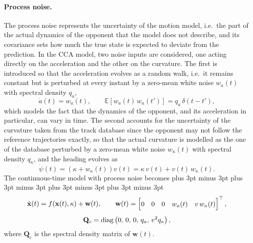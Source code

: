 \paragraph{Process noise.} The process noise represents the uncertainty of the motion model,
i.e.\ the part of the actual dynamics of the opponent that the model does not describe, and its
covariance sets how much the true state is expected to deviate from the prediction. In the CCA
model, two noise inputs are considered, one acting directly on the acceleration and the other on
the curvature. The first is introduced so that the acceleration evolves as a random walk, i.e.\
it remains constant but is perturbed at every instant by a zero-mean white noise $w_a(t)$ with
spectral density $q_a$,
\begin{equation}
    \dot a(t) = w_a(t), \qquad
    \mathbb{E}\left[w_a(t)\,w_a(t')\right] = q_a\,\delta(t - t'),
\end{equation}
which models the fact that the dynamics of the opponent, and its acceleration in particular,
can vary in time. The second accounts for
the uncertainty of the curvature taken from the track database since the opponent may not follow
the reference trajectories exactly, so that the actual curvature is modelled as the one of the
database perturbed by a zero-mean white noise $w_\kappa(t)$ with spectral density $q_\kappa$,
and the heading evolves as
\begin{equation}
    \dot\psi(t) = \left(\kappa + w_\kappa(t)\right) v(t) = \kappa\,v(t) + v(t)\,w_\kappa(t).
\end{equation}
The continuous-time model with process noise becomes
\abovedisplayskip=16pt plus 3pt minus 3pt \belowdisplayskip=16pt plus 3pt minus 3pt
\abovedisplayshortskip=16pt plus 3pt minus 3pt \belowdisplayshortskip=16pt plus 3pt minus 3pt
\begin{equation}
    \renewcommand{\arraystretch}{1.3}\setlength{\jot}{8pt}
    \begin{gathered}
    \dot{\mathbf{x}}(t) = f(\mathbf{x}(t),\kappa) + \mathbf{w}(t),
    \qquad
    \mathbf{w}(t) =
    \begin{bmatrix}
        0 & 0 & 0 & w_a(t) & v\,w_\kappa(t)
    \end{bmatrix}^\top, \\
    \mathbf{Q}_c = \operatorname{diag}\left(0,\,0,\,0,\,q_a,\,v^2 q_\kappa\right),
    \end{gathered}
    \label{eq:tt_noise}
\end{equation}
where $\mathbf{Q}_c$ is the spectral density matrix of $\mathbf{w}(t)$.

